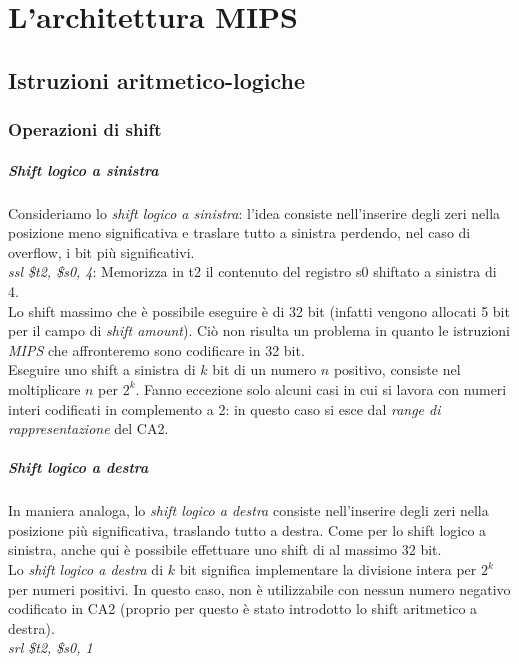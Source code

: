 \documentclass[class=book, crop=false]{standalone}
\begin{document}
\chapter{L'architettura MIPS}

\section{Istruzioni aritmetico-logiche}

\subsection{Operazioni di shift}

\paragraph{Shift logico a sinistra}
Consideriamo lo \emph{shift logico a sinistra}: l'idea consiste nell'inserire degli zeri nella posizione meno significativa e traslare tutto a sinistra perdendo, nel caso di overflow, i bit più significativi.\\
\emph{ssl \$t2, \$s0, 4}: Memorizza in t2 il contenuto del registro s0 shiftato a sinistra di 4.\\
Lo shift massimo che è possibile eseguire è di 32 bit (infatti vengono allocati 5 bit per il campo di \emph{shift amount}). Ciò non risulta un problema in quanto le istruzioni \emph{MIPS} che affronteremo sono codificare in 32 bit.\\
Eseguire uno shift a sinistra di \(k\) bit di un numero \(n\) positivo, consiste nel moltiplicare \(n\) per \(2^k\). Fanno eccezione solo alcuni casi in cui si lavora con numeri interi codificati in complemento a 2: in questo caso si esce dal \emph{range di rappresentazione} del CA2.

\paragraph{Shift logico a destra}
In maniera analoga, lo \emph{shift logico a destra} consiste nell'inserire degli zeri nella posizione più significativa, traslando tutto a destra. Come per lo shift logico a sinistra, anche qui è possibile effettuare uno shift di al massimo 32 bit.\\
Lo \emph{shift logico a destra} di \(k\) bit significa implementare la divisione intera per \(2^k\) per numeri positivi. In questo caso, non è utilizzabile con nessun numero negativo codificato in CA2 (proprio per questo è stato introdotto lo shift aritmetico a destra).\\
\emph{srl \$t2, \$s0, 1}
\end{document}
